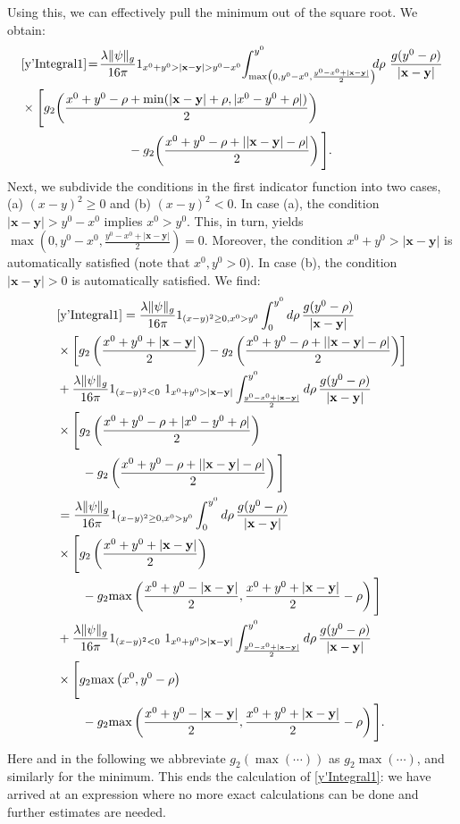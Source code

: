 \documentclass[b5paper,draft,openbib,12pt]{memoir}
\newcommand{\vx}{\mathbf{x}}
\newcommand{\vy}{\mathbf{y}}
\begin{document}
Using this, we can effectively pull the minimum out of 
the square root. We obtain:
\begin{align}\nonumber
    &\eqref{y'Integral1} \!=\!\frac{\lambda \|\psi\|_g}{16\pi} 1_{x^0+y^0>|\vx-\vy|>y^0-x^0}\! \int_{\max\left(0,y^0-x^0,\frac{y^0-x^0+|\vx-\vy|}{2}\right)}^{y^0} \!\!\!d\rho ~ \frac{ g(y^0-\rho)}{|\vx-\vy|}\\ 
    &\times\Bigg[ g_2\!\left(\frac{x^0+y^0-\rho + \min(|\vx-\vy|+\rho,|x^0-y^0+\rho|)}{2}\right)\notag\\
    &\hspace{3cm}-g_2\!\left(\frac{x^0+y^0-\rho + ||\vx-\vy|-\rho|}{2}\right)\Bigg].
\label{CasesFirstTermEnd}
\end{align}
Next, we subdivide the conditions in the first 
indicator function into two cases, (a) $(x-y)^2\ge0$ and 
(b) $(x-y)^2<0$. In case (a), the condition 
$|\vx-\vy|>y^0-x^0$ implies $x^0>y^0$. This, in turn, 
yields $\max\left(0,y^0-x^0,\frac{y^0-x^0+|\vx-\vy|}{2}
\right) = 0$.  Moreover, the condition 
$x^0+y^0>|\vx-\vy|$ is automatically satisfied (note 
that $x^0,y^0>0$). In case (b), the condition 
$|\vx-\vy|>0$ is automatically satisfied. We find:
\begin{align}
 \nonumber
     &\eqref{y'Integral1} = \frac{\lambda \|\psi\|_g}{16\pi} 1_{(x-y)^2\ge 0, x^0>y^0} \int_{0}^{y^0} d\rho  \, \frac{ g(y^0-\rho)}{|\vx-\vy|}\\\nonumber
    &\times\left[ g_2\left(\frac{x^0+y^0 + |\vx-\vy|}{2}\right)
    -g_2\left(\frac{x^0+y^0-\rho + ||\vx-\vy|-\rho|}{2}\right)\right]\\\nonumber
    &+ \frac{\lambda \|\psi\|_g}{16\pi} 1_{(x-y)^2<0}~1_{ x^0+y^0>|\vx-\vy|} \int_{\frac{y^0-x^0+|\vx-\vy|}{2}}^{y^0} d\rho \, \frac{ g(y^0-\rho)}{|\vx-\vy|}\\\nonumber
    &\times \Bigg[ g_2\left(\frac{x^0+y^0-\rho + |x^0-y^0+\rho|}{2}\right)\\\notag
    &\quad \quad -g_2\left(\frac{x^0+y^0-\rho + ||\vx-\vy|-\rho|}{2}\right)\Bigg]\\\nonumber
    &= \frac{\lambda \|\psi\|_g}{16\pi} 1_{(x-y)^2\ge0, x^0>y^0} \int_{0}^{y^0} d\rho \, \frac{ g(y^0-\rho)}{|\vx-\vy|}\\\nonumber
    &\times \Bigg[ g_2\left(\frac{x^0+y^0 + |\vx-\vy|}{2}\right)\\\notag
    &\quad \quad -g_2\!\max\left(\frac{x^0+y^0- |\vx-\vy|}{2},\frac{x^0+y^0+ |\vx-\vy|}{2}-\rho\right)\Bigg]\\\nonumber
    &+ \frac{\lambda \|\psi\|_g}{16\pi} 1_{(x-y)^2<0}~1_{ x^0+y^0>|\vx-\vy|} \int_{\frac{y^0-x^0+|\vx-\vy|}{2}}^{y^0} d\rho \, \frac{ g(y^0-\rho)}{|\vx-\vy|}\\
    &\times\Bigg[ g_2\!\max\left(x^0,y^0-\rho\right)\notag\\
    &\quad \quad -g_2\!\max\left(\frac{x^0+y^0-|\vx-\vy|}{2},\frac{x^0+y^0+|\vx-\vy|}{2}-\rho\right)\Bigg].
\label{eq:resulty'Integral1}
\end{align}
Here and in the following we abbreviate 
$g_2(\max(\cdots))$ as $g_2 \max (\cdots)$, and 
similarly for the minimum. This ends the calculation 
of \eqref{y'Integral1}: we have arrived at an 
expression where no more exact calculations can be 
done and further estimates are needed.
\end{document}
